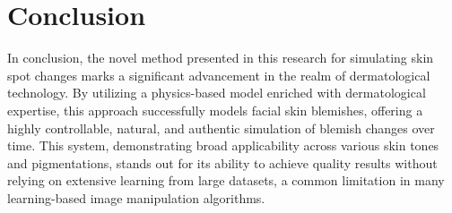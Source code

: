 
\chapter{Conclusion}
\begin{spacing}{1.5}
\setlength{\parskip}{0.3in}




In conclusion, the novel method presented in this research for simulating skin spot changes marks a significant advancement in the realm of dermatological technology. By utilizing a physics-based model enriched with dermatological expertise, this approach successfully models facial skin blemishes, offering a highly controllable, natural, and authentic simulation of blemish changes over time. This system, demonstrating broad applicability across various skin tones and pigmentations, stands out for its ability to achieve quality results without relying on extensive learning from large datasets, a common limitation in many learning-based image manipulation algorithms.


\end{spacing}
